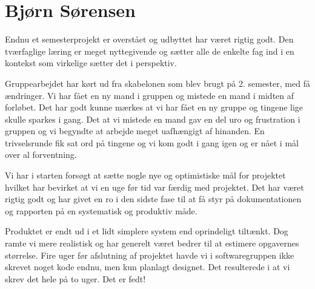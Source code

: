 \section{Bjørn Sørensen}

Endnu et semesterprojekt er overstået og udbyttet har været rigtig godt. Den tværfaglige læring er meget nyttegivende og sætter alle de enkelte fag ind i en kontekst som virkelige sætter det i perspektiv.

Gruppearbejdet har kørt ud fra skabelonen som blev brugt på 2. semester, med få ændringer. Vi har fået en ny mand i gruppen og mistede en mand i midten af forløbet. Det har godt kunne mærkes at vi har fået en ny gruppe og tingene lige skulle sparkes i gang. 
Det at vi mistede en mand gav en del uro og frustration i gruppen og vi begyndte at arbejde meget uafhængigt af hinanden. En trivselsrunde fik sat ord på tingene og vi kom godt i gang igen og er nået i mål over al forventning.

Vi har i starten forsøgt at sætte nogle nye og optimistiske mål for projektet hvilket har bevirket at vi en uge før tid var færdig med projektet. Det har været rigtig godt og har givet en ro i den sidste fase til at få styr på dokumentationen og rapporten på en systematisk og produktiv måde.

Produktet er endt ud i et lidt simplere system end oprindeligt tiltænkt. Dog ramte vi mere realistisk og har generelt været bedrer til at estimere opgavernes størrelse. Fire uger før afslutning af projektet havde vi i softwaregruppen ikke skrevet noget kode endnu, men kun planlagt designet. Det resulterede i at vi skrev det hele på to uger. Det er fedt!